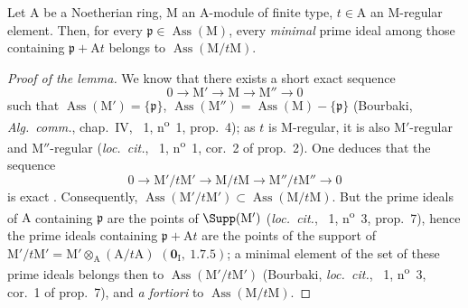 \begin{lemma}[16.4.6.3]
\label{0.16.4.6.3}
Let $\mathrm{A}$ be a Noetherian ring, $\mathrm{M}$ an $\mathrm{A}$-module of finite type, $t\in\mathrm{A}$ an $\mathrm{M}$-regular element.
Then, for every $\mathfrak{p}\in\operatorname{Ass}(\mathrm{M})$, every \emph{minimal} prime ideal among those containing $\mathfrak{p}+\mathrm{A}t$ belongs to $\operatorname{Ass}(\mathrm{M}/t\mathrm{M})$.
\end{lemma}

\begin{proof}[Proof of the lemma]
We know that there exists a short exact sequence
\[
  0\to\mathrm{M}'\to\mathrm{M}\to\mathrm{M}''\to 0
\]
such that $\operatorname{Ass}(\mathrm{M}')=\{\mathfrak{p}\}$, $\operatorname{Ass}(\mathrm{M}'')=\operatorname{Ass}(\mathrm{M})-\{\mathfrak{p}\}$ (Bourbaki, \emph{Alg.~comm.}, chap.~IV, \textsection~1, n\textsuperscript{o}~1, prop.~4); as $t$ is $\mathrm{M}$-regular, it is also $\mathrm{M}'$-regular and $\mathrm{M}''$-regular (\emph{loc.~cit.}, \textsection~1, n\textsuperscript{o}~1, cor.~2 of prop.~2).
One deduces that the sequence
\[
  0\to\mathrm{M}'/t\mathrm{M}'\to\mathrm{M}/t\mathrm{M}\to\mathrm{M}''/t\mathrm{M}''\to 0
\]
is exact .
Consequently, $\operatorname{Ass}(\mathrm{M}'/t\mathrm{M}')\subset\operatorname{Ass}(\mathrm{M}/t\mathrm{M})$.
But the prime ideals of $\mathrm{A}$ containing $\mathfrak{p}$ are the points of $\Supp(\mathrm{M}')$ (\emph{loc.~cit.}, \textsection~1, n\textsuperscript{o}~3, prop.~7), hence the prime ideals containing $\mathfrak{p}+\mathrm{A}t$ are the points of the support of $\mathrm{M}'/t\mathrm{M}'=\mathrm{M}'\otimes_\mathrm{A}(\mathrm{A}/t\mathrm{A})$ $(\mathbf{0}_\mathrm{I},~1.7.5)$; a minimal element of the set of these prime ideals belongs then to $\operatorname{Ass}(\mathrm{M}'/t\mathrm{M}')$ (Bourbaki, \emph{loc.~cit.}, \textsection~1, n\textsuperscript{o}~3, cor.~1 of prop.~7), and \emph{a fortiori} to $\operatorname{Ass}(\mathrm{M}/t\mathrm{M})$.
\end{proof}

